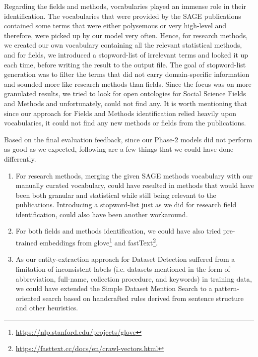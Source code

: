 \documentclass[runningheads]{llncs}
\begin{document}
	Regarding the fields and methods, vocabularies played an immense role in their identification. The vocabularies that were provided by the SAGE publications contained some terms that were either polysemous or very high-level and therefore, were picked up by our model very often. Hence, for research methods, we created our own vocabulary containing all the relevant statistical methods, and for fields, we introduced a stopword-list of irrelevant terms and looked it up each time, before writing the result to the output file. The goal of stopword-list generation was to filter the terms that did not carry domain-specific information and sounded more like research methods than fields. Since the focus was on more granulated results, we tried to look for open ontologies for Social Science Fields and Methods and unfortunately, could not find any. It is worth mentioning that since our approach for Fields and Methods identification relied heavily upon vocabularies, it could not find any new methods or fields from the publications. 
	
	Based on the final evaluation feedback, since our Phase-2 models did not perform as good as we expected, following are a few things that we could have done differently.
	\begin{enumerate}
		\item For research methods, merging the given SAGE methods vocabulary with our manually curated vocabulary, could have resulted in methods that would have been both granular and statistical while still being relevant to the publications. Introducing a stopword-list just as we did for research field identification, could also have been another workaround. 
		\item For both fields and methods identification, we could have also tried pre-trained embeddings from glove\footnote{\url{https://nlp.stanford.edu/projects/glove}} and fastText\footnote{\url{https://fasttext.cc/docs/en/crawl-vectors.html}}.
		\item As our entity-extraction approach for Dataset Detection suffered from a limitation of inconsistent labels (i.e. datasets mentioned in the form of abbreviation, full-name, collection procedure, and keywords) in training data, we could have extended the Simple Dataset Mention Search to a pattern-oriented search based on handcrafted rules derived from sentence structure and other heuristics. 
	\end{enumerate}
	
\end{document}
